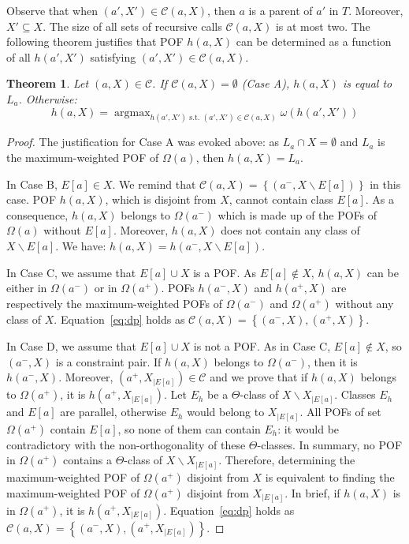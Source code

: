 \documentclass{article}
\DeclareMathOperator*{\argmax}{argmax}
\newtheorem{theorem}{Theorem}
\newcommand{\set}[1]{\left\{ #1 \right\}}
\begin{document}
Observe that when $(a',X') \in \mathcal{C}(a,X)$, then $a$ is a parent of $a'$ in $T$. Moreover, $X' \subseteq X$. The size of all sets of recursive calls $\mathcal{C}(a,X)$ is at most two.
The following theorem justifies that POF $h(a,X)$ can be determined as a function of all $h(a',X')$ satisfying $(a',X') \in \mathcal{C}(a,X)$.

\begin{theorem}
Let $(a,X) \in \mathcal{C}$. If $\mathcal{C}(a,X) = \emptyset$ (Case A), $h(a,X)$ is equal to $L_a$. Otherwise:
\begin{equation}
h(a,X) = \argmax_{h(a',X') \mbox{~s.t.~} (a',X') \in \mathcal{C}(a,X)} \omega\left(h(a',X')\right)
\label{eq:dp}
\end{equation}
\label{th:dp_pairs}
\end{theorem}
\begin{proof}
The justification for Case A was evoked above: as $L_a \cap X = \emptyset$ and $L_a$ is the maximum-weighted POF of $\Omega(a)$, then $h(a,X) = L_a$.

In Case B, $E\left[a\right] \in X$. We remind that $\mathcal{C}(a,X) = \set{(a^-,X\backslash E\left[a\right])}$ in this case. POF $h(a,X)$, which is disjoint from $X$, cannot contain class $E\left[a\right]$. As a consequence, $h(a,X)$ belongs to $\Omega(a^-)$ which is made up of the POFs of $\Omega(a)$ without $E\left[a\right]$. Moreover, $h(a,X)$ does not contain any class of $X\backslash E\left[a\right]$. We have: $h(a,X) = h(a^-,X\backslash E\left[a\right])$.

In Case C, we assume that $E\left[a\right] \cup X$ is a POF. As $E\left[a\right] \notin X$, $h(a,X)$ can be either in $\Omega(a^-)$ or in $\Omega(a^+)$. POFs $h(a^-,X)$ and $h(a^+,X)$ are respectively the maximum-weighted POFs of $\Omega(a^-)$ and $\Omega(a^+)$ without any class of $X$. Equation~\eqref{eq:dp} holds as $\mathcal{C}(a,X) = \set{(a^-,X),(a^+,X)}$.

In Case D, we assume that $E\left[a\right] \cup X$ is not a POF. As in Case C, $E\left[a\right] \notin X$, so $(a^-,X)$ is a constraint pair. If $h(a,X)$ belongs to $\Omega(a^-)$, then it is $h(a^-,X)$. Moreover, $(a^+,X_{|E[a]})\in \mathcal{C}$ and we prove that if $h(a,X)$ belongs to $\Omega(a^+)$, it is $h(a^+,X_{|E[a]})$. Let $E_h$ be a $\Theta$-class of $X\backslash X_{|E[a]}$. Classes $E_h$ and $E\left[a\right]$ are parallel, otherwise $E_h$ would belong to $X_{|E[a]}$. All POFs of set $\Omega(a^+)$ contain $E\left[a\right]$, so none of them can contain $E_h$: it would be contradictory with the non-orthogonality of these $\Theta$-classes. In summary, no POF in $\Omega(a^+)$ contains a $\Theta$-class of $X\backslash X_{|E[a]}$. Therefore, determining the maximum-weighted POF of $\Omega(a^+)$ disjoint from $X$ is equivalent to finding the maximum-weighted POF  of $\Omega(a^+)$ disjoint from $X_{|E[a]}$. In brief, if $h(a,X)$ is in $\Omega(a^+)$, it is $h(a^+,X_{|E[a]})$. Equation~\eqref{eq:dp} holds as $\mathcal{C}(a,X) = \set{(a^-,X),(a^+,X_{|E[a]})}$.
\end{proof}
\end{document}
